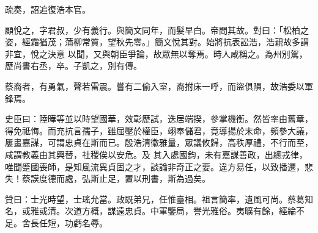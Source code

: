 \begin{pinyinscope}
 疏奏，詔追復浩本官。



 顧悅之，字君叔，少有義行。與簡文同年，而髮早白。帝問其故。對曰：「松柏之姿，經霜猶茂；蒲柳常質，望秋先零。」簡文悅其對。始將抗表訟浩，浩親故多謂非宜，悅之決意
 以聞，又與朝臣爭論，故眾無以奪焉。時人咸稱之。為州別駕，歷尚書右丞，卒。子凱之，別有傳。



 蔡裔者，有勇氣，聲若雷震。嘗有二偷入室，裔拊床一呼，而盜俱隕，故浩委以軍鋒焉。



 史臣曰：陸曄等並以時望國華，效彰歷試，迭居端揆，參掌機衡。然皆率由舊章，得免祗悔。而充抗言孺子，雖屈壓於權臣，翊奉儲君，竟導揚於末命，頻參大議，屢畫嘉謀，可謂忠貞在斯而已。殷浩清徽雅量，眾議攸歸，高秩厚禮，不行而至，咸謂教義由其興替，社稷俟以安危。及
 其入處國鈞，未有嘉謀善政，出總戎律，唯聞蹙國喪師，是知風流異貞固之才，談論非奇正之要。違方易任，以致播遷，悲失！蔡謨度德而處，弘斯止足，置以刑書，斯為過矣。



 贊曰：士光時望，士瑤允當。政既弟兄，任惟臺相。祖言簡率，遺風可尚。蔡葛知名，或雅或清。次道方概，謀遠忠貞。中軍鑒局，譽光雅俗。夷曠有餘，經綸不足。舍長任短，功虧名辱。



\end{pinyinscope}
